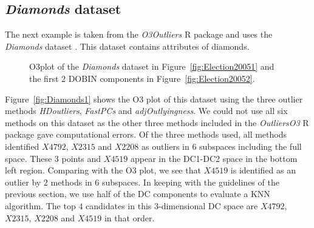 \documentclass[letter,12pt]{article}
\begin{document}
\subsection{\textit{Diamonds} dataset}\label{sec:ResWithVis2}

The next example is taken from the \textit{O3Outliers} R package \citep{O3Rpack} and uses the \textit{Diamonds} dataset \citep{ggplot2}. This dataset contains attributes of diamonds.

\begin{figure}[!ht]
	\centering
	\hfill
	\caption{O3plot of the \textit{Diamonds} dataset in Figure~\ref{fig:Election20051} and the first 2 DOBIN components in Figure~\ref{fig:Election20052}.}
	\label{fig:Diamonds}
\end{figure}

Figure~\ref{fig:Diamonds1} shows the O3 plot of this dataset using the three outlier methods \textit{HDoutliers}, \textit{FastPCs} and \textit{adjOutlyingness}. We could not use all six methods on this dataset as the other three methods included in the \textit{OutliersO3} R package gave computational errors. Of the three methods used, all methods identified $X4792$, $X2315$ and $X2208$ as outliers in 6 subspaces including the full space. These $3$ points and $X4519$ appear in the DC1-DC2 space in the bottom left region. Comparing with the O3 plot, we see that $X4519$ is identified as an outlier by $2$ methods in $6$ subspaces. In keeping with the guidelines of the previous section, we use half of the DC components to evaluate a KNN algorithm. The top $4$ candidates in this $3$-dimensional DC space are $X4792$, $X2315$, $X2208$ and $X4519$ in that order.
\end{document}
